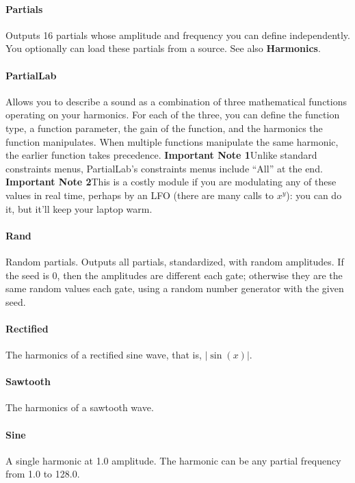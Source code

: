 \documentclass{article}
\begin{document}
\paragraph{Partials}  Outputs 16 partials whose amplitude and frequency you can define independently.  You optionally can load these partials from a source.  See also {\bf Harmonics}.

\paragraph{PartialLab}  Allows you to describe a sound as a combination of three mathematical functions operating on your harmonics.  For each of the three, you can define the function type, a function parameter, the gain of the function, and the harmonics the function manipulates.  When multiple functions manipulate the same harmonic, the earlier function takes precedence.  {\bf Important Note 1}\quad Unlike standard constraints menus, PartialLab's constraints menus include ``All'' at the end.  {\bf Important Note 2}\quad This is a costly module if you are modulating any of these values in real time, perhaps by an LFO (there are many calls to \(x^y\)): you can do it, but it'll keep your laptop warm.

\paragraph{Rand}  Random partials.  Outputs all partials, standardized, with random amplitudes.  If the seed is 0, then the amplitudes are different each gate; otherwise they are the same random values each gate, using a random number generator with the given seed.

\paragraph{Rectified}  The harmonics of a rectified sine wave, that is, \(|\sin(x)|\).

\paragraph{Sawtooth}  The harmonics of a sawtooth wave.

\paragraph{Sine}  A single harmonic at 1.0 amplitude.  The harmonic can be any partial frequency from 1.0 to 128.0.
\end{document}
